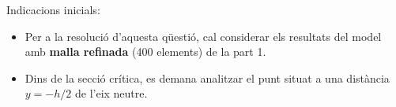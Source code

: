 \documentclass[a4paper]{article}
\begin{document}
Indicacions inicials:
\begin{itemize}
	\item Per a la resolució d'aquesta qüestió, cal considerar els resultats del model amb \textbf{malla refinada} (400 elements) de la part 1.
	\item Dins de la secció crítica, es demana analitzar el punt situat a una distància $y=-h/2$ de l'eix neutre.
\end{itemize}

\begin{figure}[H]
	\centering
\end{figure}
\end{document}
